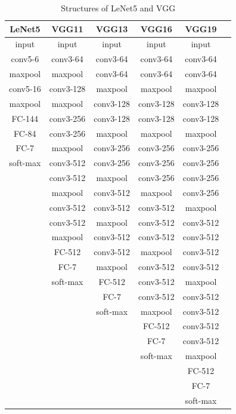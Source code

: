 \documentclass[journal, onecolumn]{IEEEtran}
\begin{document}
\begin{table}
\caption{Structures of LeNet5 and VGG}
\label{tab:LeNet5-VGG}
\begin{center}
\begin{tabular}{|c|c|c|c|c| p{5cm}|}
\hline
LeNet5 & VGG11      & VGG13         & VGG16     & VGG19  \\ \hline
input & input & input               & input & input  \\
conv5-6 & conv3-64   & conv3-64     & conv3-64  & conv3-64  \\
maxpool & maxpool & conv3-64        & conv3-64 & conv3-64  \\
conv5-16 & conv3-128 & maxpool      & maxpool  & maxpool  \\
maxpool & maxpool & conv3-128       & conv3-128 & conv3-128  \\
FC-144 & conv3-256 & conv3-128      & conv3-128 & conv3-128  \\
FC-84 & conv3-256 & maxpool         & maxpool & maxpool  \\
FC-7 & maxpool & conv3-256          & conv3-256 & conv3-256  \\
soft-max & conv3-512 & conv3-256    & conv3-256 & conv3-256  \\
 & conv3-512 & maxpool              & conv3-256 & conv3-256  \\
 & maxpool & conv3-512              & maxpool & conv3-256  \\
 & conv3-512 & conv3-512            & conv3-512 & maxpool  \\
 & conv3-512 & maxpool              & conv3-512 & conv3-512  \\
 & maxpool & conv3-512              & conv3-512 & conv3-512  \\
 & FC-512  & conv3-512              & maxpool & conv3-512  \\
 &FC-7 & maxpool                    & conv3-512 & conv3-512  \\
 & soft-max &    FC-512                & conv3-512 & maxpool  \\
 &  &  FC-7                         & conv3-512 & conv3-512  \\
  &  &  soft-max                        & maxpool & conv3-512  \\
   &  &                             & FC-512 & conv3-512  \\
    &  &                            & FC-7 & conv3-512  \\
  &  &                          &      soft-max     & maxpool  \\
   &  &                     &               & FC-512   \\
    &  &                            &       & FC-7  \\
        &  &                        &       & soft-max \\  \hline
\end{tabular}
\end{center}
\end{table}
\end{document}
